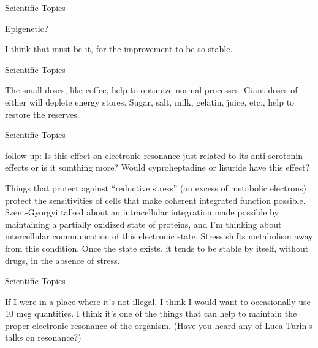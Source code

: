\documentclass[11pt,oneside,openany,extrafontsizes]{memoir}
\begin{document}
\begin{qaexchange}{Scientific Topics}

    \begin{question}
        Epigenetic?
    \end{question}

    \begin{answer}
        I think that must be it, for the improvement to be so stable.
    \end{answer}
\end{qaexchange}

\begin{standalonequote}{Scientific Topics}

    \begin{answer}
        The small doses, like coffee, help to optimize normal processes. Giant doses of either will deplete energy stores. Sugar, salt, milk, gelatin, juice, etc., help to restore the reserves.
    \end{answer}
\end{standalonequote}

\begin{qaexchange}{Scientific Topics}

    \begin{question}
        follow-up: Is this effect on electronic resonance just related to its anti serotonin effects or is it somthing more? Would cyproheptadine or lisuride have this effect?
    \end{question}

    \begin{answer}
        Things that protect against \enquote{reductive stress} (an excess of metabolic electrons) protect the sensitivities of cells that make coherent integrated function possible. Szent-Gyorgyi talked about an intracellular integration made possible by maintaining a partially oxidized state of proteins, and I'm thinking about intercellular communication of this electronic state. Stress shifts metabolism away from this condition. Once the state exists, it tends to be stable by itself, without drugs, in the absence of stress.
    \end{answer}
\end{qaexchange}

\begin{standalonequote}{Scientific Topics}

    \begin{answer}
        If I were in a place where it's not illegal, I think I would want to occasionally use 10 mcg quantities. I think it's one of the things that can help to maintain the proper electronic resonance of the organism. (Have you heard any of Luca Turin's talks on resonance?)
    \end{answer}
\end{standalonequote}
\end{document}
